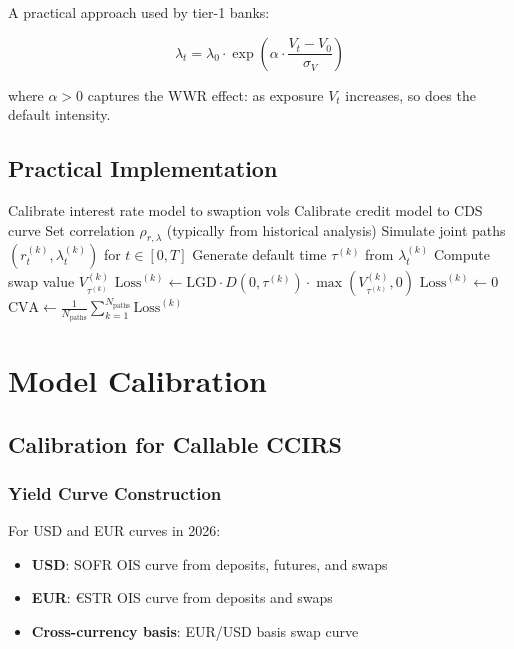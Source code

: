 \documentclass[11pt,a4paper]{article}
\theoremstyle{definition}
\newcommand{\LGD}{\mathrm{LGD}}
\newcommand{\CVA}{\mathrm{CVA}}
\begin{document}
A practical approach used by tier-1 banks:

\begin{equation}
\lambda_t = \lambda_0 \cdot \exp\left(\alpha \cdot \frac{V_t - V_0}{\sigma_V}\right)
\end{equation}

where $\alpha > 0$ captures the WWR effect: as exposure $V_t$ increases, so does the default intensity.

\subsection{Practical Implementation}

\begin{algorithm}
\caption{Monte Carlo CVA with Wrong-Way Risk}
\begin{algorithmic}[1]
\State Calibrate interest rate model to swaption vols
\State Calibrate credit model to CDS curve
\State Set correlation $\rho_{r,\lambda}$ (typically from historical analysis)
    \State Simulate joint paths $(r_t^{(k)}, \lambda_t^{(k)})$ for $t \in [0,T]$
    \State Generate default time $\tau^{(k)}$ from $\lambda_t^{(k)}$
        \State Compute swap value $V_{\tau^{(k)}}^{(k)}$
        \State $\text{Loss}^{(k)} \gets \LGD \cdot D(0,\tau^{(k)}) \cdot \max(V_{\tau^{(k)}}^{(k)}, 0)$
    \Else
        \State $\text{Loss}^{(k)} \gets 0$
    \EndIf
\EndFor
\State \Return $\CVA \gets \frac{1}{N_{\text{paths}}} \sum_{k=1}^{N_{\text{paths}}} \text{Loss}^{(k)}$
\end{algorithmic}
\end{algorithm}

\section{Model Calibration}

\subsection{Calibration for Callable CCIRS}

\subsubsection{Yield Curve Construction}

For USD and EUR curves in 2026:
\begin{itemize}
    \item \textbf{USD}: SOFR OIS curve from deposits, futures, and swaps
    \item \textbf{EUR}: €STR OIS curve from deposits and swaps
    \item \textbf{Cross-currency basis}: EUR/USD basis swap curve
\end{itemize}
\end{document}
